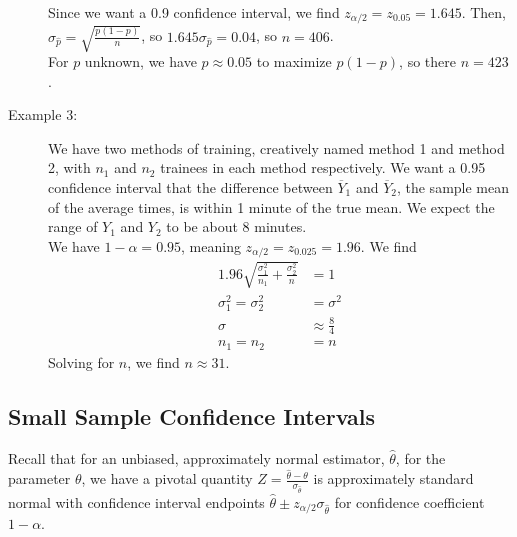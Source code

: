 \documentclass[10pt]{extarticle}
\begin{document}
\begin{description}
      Since we want a 0.9 confidence interval, we find $z_{\alpha/2} = z_{0.05} = 1.645$. Then, $\sigma_{\hat{p}} = \sqrt{\frac{p(1-p)}{n}}$, so $1.645\sigma_{\hat{p}} = 0.04$, so $n = 406$.\\

      For $p$ unknown, we have $p\approx 0.05$ to maximize $p(1-p)$, so there $n=423$.
    \item[Example 3:] We have two methods of training, creatively named method 1 and method 2, with $n_1$ and $n_2$ trainees in each method respectively. We want a 0.95 confidence interval that the difference between $\overline{Y}_{1}$ and $\overline{Y}_{2}$, the sample mean of the average times, is within 1 minute of the true mean. We expect the range of $Y_1$ and $Y_2$ to be about $8$ minutes.\\

      We have $1-\alpha = 0.95$, meaning $z_{\alpha/2} = z_{0.025} = 1.96$. We find
      \begin{align*}
        1.96 \sqrt{\frac{\sigma_1^2}{n_1} + \frac{\sigma_2^2}{n}} &= 1\\
        \sigma_1^2 = \sigma_2^2 &= \sigma^2\\
        \sigma &\approx \frac{8}{4}\\
        n_1 = n_2 &= n
      \end{align*}
      Solving for $n$, we find $n \approx 31$.
  \end{description}
  \subsection{Small Sample Confidence Intervals}%
  Recall that for an unbiased, approximately normal estimator, $\hat{\theta}$, for the parameter $\theta$, we have a pivotal quantity $Z = \frac{\hat{\theta} - \theta}{\sigma_{\hat{\theta}}}$ is approximately standard normal with confidence interval endpoints $\hat{\theta} \pm z_{\alpha/2}\sigma_{\hat{\theta}}$ for confidence coefficient $1-\alpha$.\\
\end{document}
